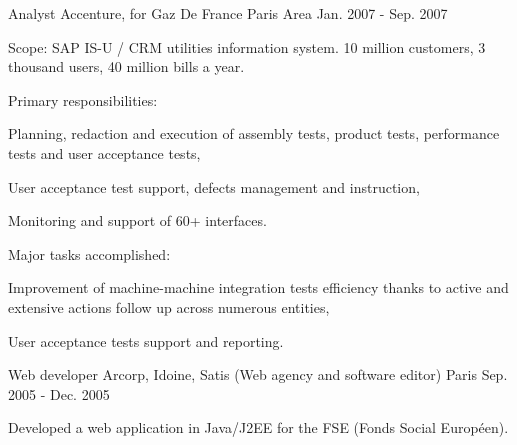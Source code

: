 \begin{cventries}
  \cventry
    {Analyst} %
    {Accenture, for Gaz De France} %
    {Paris Area} %
    {Jan. 2007 - Sep. 2007} %
    {
      \begin{cvitems} %
        \item {Scope: SAP IS-U / CRM utilities information system. 10 million customers, 3 thousand users, 40 million bills a year.}
        \item {Primary responsibilities:}
        \begin{cvsubitems}
          \item {Planning, redaction and execution of assembly tests, product tests, performance tests and user acceptance tests,}
          \item {User acceptance test support, defects management and instruction,}
          \item {Monitoring and support of 60+ interfaces.}
        \end{cvsubitems}
        \item {Major tasks accomplished:}
        \begin{cvsubitems}
          \item {Improvement of machine-machine integration tests efficiency thanks to active and extensive actions follow up across numerous entities,}
          \item {User acceptance tests support and reporting.}
        \end{cvsubitems}
      \end{cvitems}
    }

  \cventry
    {Web developer} %
    {Arcorp, Idoine, Satis (Web agency and software editor)} %
    {Paris} %
    {Sep. 2005 - Dec. 2005} %
    {
      \begin{cvitems} %
        \item {Developed a web application in Java/J2EE for the FSE (Fonds Social Européen).}
      \end{cvitems}
    }

\end{cventries}
